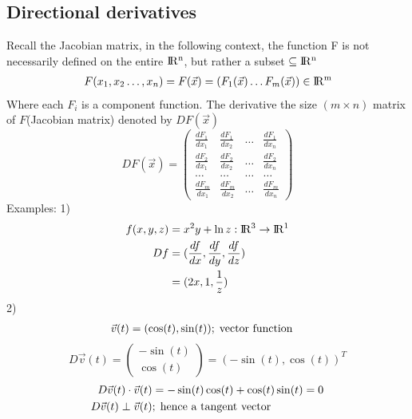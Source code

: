 \documentclass{article}
\newcommand{\R}{\rm I\!R}
\begin{document}
    \subsection{Directional derivatives}
        Recall the Jacobian matrix, in the following context, the function F is not necessarily defined on the entire $\R^n$, but rather a subset $\subseteq \R^n$
        \begin{align}
            F(x_1,x_2\dots,x_n) = F(\vec{x}) = (F_1(\vec{x})\dots F_m(\vec{x}))\in \R^m
        \end{align}
        Where each $F_i$ is a component function. The derivative the size $(m \times n)$ matrix of $F$(Jacobian matrix) denoted by $DF(\vec{x})$
        \begin{equation}
            DF(\vec{x}) = 
            \begin{pmatrix}
                \frac{dF_1}{dx_1} & \frac{dF_1}{dx_2} & \dots & \frac{dF_1}{dx_n}\\
                \frac{dF_2}{dx_1} & \frac{dF_2}{dx_2} & \dots & \frac{dF_2}{dx_n}\\
                \dots&\dots&\dots&\dots\\
                \frac{dF_m}{dx_1} & \frac{dF_m}{dx_2} & \dots & \frac{dF_m}{dx_n}
            \end{pmatrix}
        \end{equation}
        Examples:
        1)
        \begin{align}
            f(x,y,z) &= x^2 y + \ln{z} : \R^3\rightarrow\R^1\\
            Df  &= (\frac{df}{dx},\frac{df}{dy},\frac{df}{dz})\nonumber\\
                &=(2x,1,\frac{1}{z})
        \end{align}
        2)
        \begin{align}
            \vec{v}(t)&=(\cos(t),\sin(t));\text{\;vector function}
        \end{align}
        \begin{equation}
            D\vec{v}(t) = \begin{pmatrix}
                -\sin(t)\\
                \cos(t)
            \end{pmatrix}=(-\sin(t),\cos(t))^T
        \end{equation}
        \begin{align}
            D\vec{v}(t)\cdot\vec{v}(t)&=-\sin(t)\cos(t)+\cos(t)\sin(t)=0\\
            D\vec{v}(t)\perp \vec{v}(t)&;\text{\;hence a tangent vector}
        \end{align}
\end{document}
